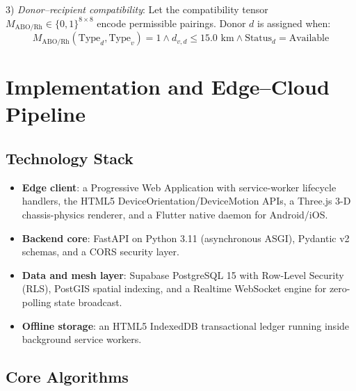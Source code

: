 \documentclass[conference]{IEEEtran}
\begin{document}
3) \textit{Donor--recipient compatibility}: Let the compatibility tensor $M_{\text{ABO/Rh}} \in \{0, 1\}^{8 \times 8}$ encode permissible pairings. Donor $d$ is assigned when:
\begin{equation}
M_{\text{ABO/Rh}}(\text{Type}_d, \text{Type}_v) = 1 \land d_{v,d} \le 15.0\text{ km} \land \text{Status}_d = \text{Available}
\end{equation}

\section{Implementation and Edge--Cloud Pipeline}

\subsection{Technology Stack}
\begin{itemize}
    \item \textbf{Edge client}: a Progressive Web Application with service-worker lifecycle handlers, the HTML5 DeviceOrientation/DeviceMotion APIs, a Three.js 3-D chassis-physics renderer, and a Flutter native daemon for Android/iOS.
    \item \textbf{Backend core}: FastAPI on Python 3.11 (asynchronous ASGI), Pydantic v2 schemas, and a CORS security layer.
    \item \textbf{Data and mesh layer}: Supabase PostgreSQL 15 with Row-Level Security (RLS), PostGIS spatial indexing, and a Realtime WebSocket engine for zero-polling state broadcast.
    \item \textbf{Offline storage}: an HTML5 IndexedDB transactional ledger running inside background service workers.
\end{itemize}

\subsection{Core Algorithms}
\end{document}

